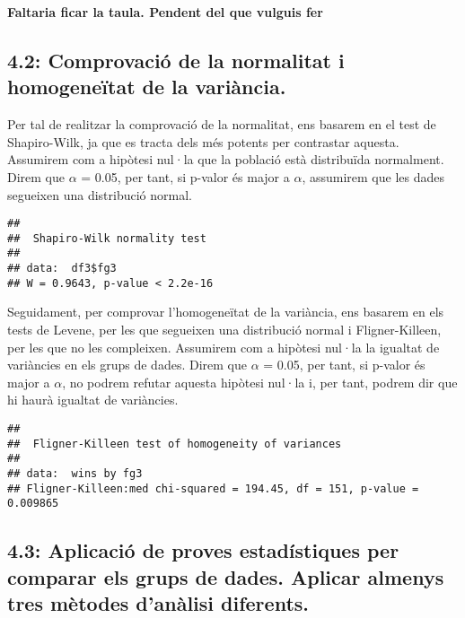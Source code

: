 \documentclass[
]{article}
\begin{document}
\textbf{Faltaria ficar la taula. Pendent del que vulguis fer}

\hypertarget{comprovaciuxf3-de-la-normalitat-i-homogeneuxeftat-de-la-variuxe0ncia.}{%
\subsection{4.2: Comprovació de la normalitat i homogeneïtat de la
variància.}\label{comprovaciuxf3-de-la-normalitat-i-homogeneuxeftat-de-la-variuxe0ncia.}}

Per tal de realitzar la comprovació de la normalitat, ens basarem en el
test de Shapiro-Wilk, ja que es tracta dels més potents per contrastar
aquesta. Assumirem com a hipòtesi nul·la que la població està
distribuïda normalment. Direm que \(\alpha\) = 0.05, per tant, si
p-valor és major a \(\alpha\), assumirem que les dades segueixen una
distribució normal.

\begin{verbatim}
## 
##  Shapiro-Wilk normality test
## 
## data:  df3$fg3
## W = 0.9643, p-value < 2.2e-16
\end{verbatim}

Seguidament, per comprovar l'homogeneïtat de la variància, ens basarem
en els tests de Levene, per les que segueixen una distribució normal i
Fligner-Killeen, per les que no les compleixen. Assumirem com a hipòtesi
nul·la la igualtat de variàncies en els grups de dades. Direm que
\(\alpha\) = 0.05, per tant, si p-valor és major a \(\alpha\), no podrem
refutar aquesta hipòtesi nul·la i, per tant, podrem dir que hi haurà
igualtat de variàncies.

\begin{verbatim}
## 
##  Fligner-Killeen test of homogeneity of variances
## 
## data:  wins by fg3
## Fligner-Killeen:med chi-squared = 194.45, df = 151, p-value = 0.009865
\end{verbatim}

\hypertarget{aplicaciuxf3-de-proves-estaduxedstiques-per-comparar-els-grups-de-dades.-aplicar-almenys-tres-muxe8todes-danuxe0lisi-diferents.}{%
\subsection{4.3: Aplicació de proves estadístiques per comparar els
grups de dades. Aplicar almenys tres mètodes d'anàlisi
diferents.}\label{aplicaciuxf3-de-proves-estaduxedstiques-per-comparar-els-grups-de-dades.-aplicar-almenys-tres-muxe8todes-danuxe0lisi-diferents.}}
\end{document}

